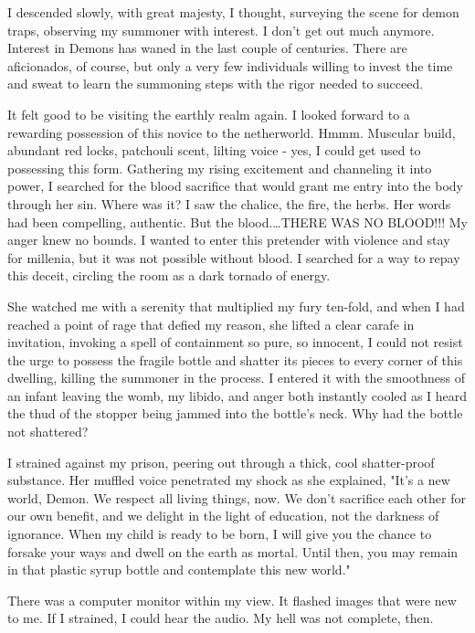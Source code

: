 I descended slowly, with great majesty, I thought, surveying the scene
for demon traps, observing my summoner with interest. I don't get out
much anymore. Interest in Demons has waned in the last couple of
centuries. There are aficionados, of course, but only a very few
individuals willing to invest the time and sweat to learn the summoning
steps with the rigor needed to succeed.

It felt good to be visiting the earthly realm again. I looked forward to
a rewarding possession of this novice to the netherworld. Hmmm. Muscular
build, abundant red locks, patchouli scent, lilting voice - yes, I could
get used to possessing this form. Gathering my rising excitement and
channeling it into power, I searched for the blood sacrifice that would
grant me entry into the body through her sin. Where was it? I saw the
chalice, the fire, the herbs. Her words had been compelling, authentic.
But the blood.\ldots{}THERE WAS NO BLOOD!!! My anger knew no bounds. I
wanted to enter this pretender with violence and stay for millenia, but
it was not possible without blood. I searched for a way to repay this
deceit, circling the room as a dark tornado of energy.

She watched me with a serenity that multiplied my fury ten-fold, and
when I had reached a point of rage that defied my reason, she lifted a
clear carafe in invitation, invoking a spell of containment so pure, so
innocent, I could not resist the urge to possess the fragile bottle and
shatter its pieces to every corner of this dwelling, killing the
summoner in the process. I entered it with the smoothness of an infant
leaving the womb, my libido, and anger both instantly cooled as I heard
the thud of the stopper being jammed into the bottle's neck. Why had the
bottle not shattered?

I strained against my prison, peering out through a thick, cool
shatter-proof substance. Her muffled voice penetrated my shock as she
explained, "It's a new world, Demon. We respect all living things, now.
We don't sacrifice each other for our own benefit, and we delight in the
light of education, not the darkness of ignorance. When my child is
ready to be born, I will give you the chance to forsake your ways and
dwell on the earth as mortal. Until then, you may remain in that plastic
syrup bottle and contemplate this new world."

There was a computer monitor within my view. It flashed images that were
new to me. If I strained, I could hear the audio. My hell was not
complete, then.
